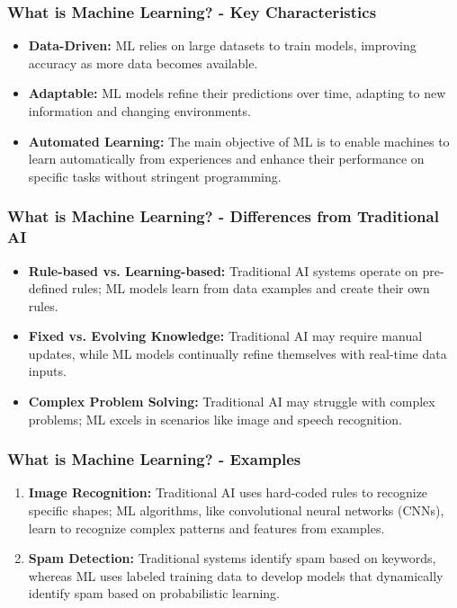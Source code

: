 \documentclass[aspectratio=169]{beamer}
\begin{document}
\begin{frame}[fragile]
    \frametitle{What is Machine Learning? - Key Characteristics}
    \begin{itemize}
        \item \textbf{Data-Driven:} 
        ML relies on large datasets to train models, improving accuracy as more data becomes available.
        
        \item \textbf{Adaptable:} 
        ML models refine their predictions over time, adapting to new information and changing environments.
        
        \item \textbf{Automated Learning:} 
        The main objective of ML is to enable machines to learn automatically from experiences and enhance their performance on specific tasks without stringent programming.
    \end{itemize}
\end{frame}

\begin{frame}[fragile]
    \frametitle{What is Machine Learning? - Differences from Traditional AI}
    \begin{itemize}
        \item \textbf{Rule-based vs. Learning-based:} 
        Traditional AI systems operate on pre-defined rules; ML models learn from data examples and create their own rules.
        
        \item \textbf{Fixed vs. Evolving Knowledge:} 
        Traditional AI may require manual updates, while ML models continually refine themselves with real-time data inputs.
        
        \item \textbf{Complex Problem Solving:} 
        Traditional AI may struggle with complex problems; ML excels in scenarios like image and speech recognition.
    \end{itemize}
\end{frame}

\begin{frame}[fragile]
    \frametitle{What is Machine Learning? - Examples}
    \begin{enumerate}
        \item \textbf{Image Recognition:} 
        Traditional AI uses hard-coded rules to recognize specific shapes; ML algorithms, like convolutional neural networks (CNNs), learn to recognize complex patterns and features from examples.
        
        \item \textbf{Spam Detection:} 
        Traditional systems identify spam based on keywords, whereas ML uses labeled training data to develop models that dynamically identify spam based on probabilistic learning.
    \end{enumerate}
\end{frame}
\end{document}
